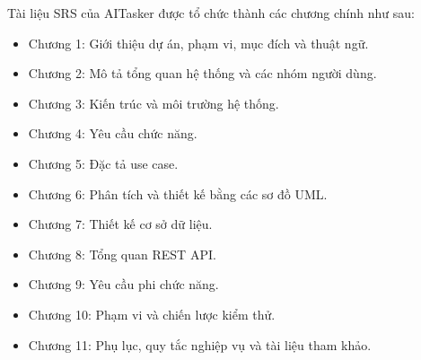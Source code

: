 Tài liệu SRS của AITasker được tổ chức thành các chương chính như sau:

\begin{itemize}
    \item Chương 1: Giới thiệu dự án, phạm vi, mục đích và thuật ngữ.
    \item Chương 2: Mô tả tổng quan hệ thống và các nhóm người dùng.
    \item Chương 3: Kiến trúc và môi trường hệ thống.
    \item Chương 4: Yêu cầu chức năng.
    \item Chương 5: Đặc tả use case.
    \item Chương 6: Phân tích và thiết kế bằng các sơ đồ UML.
    \item Chương 7: Thiết kế cơ sở dữ liệu.
    \item Chương 8: Tổng quan REST API.
    \item Chương 9: Yêu cầu phi chức năng.
    \item Chương 10: Phạm vi và chiến lược kiểm thử.
    \item Chương 11: Phụ lục, quy tắc nghiệp vụ và tài liệu tham khảo.
\end{itemize}
